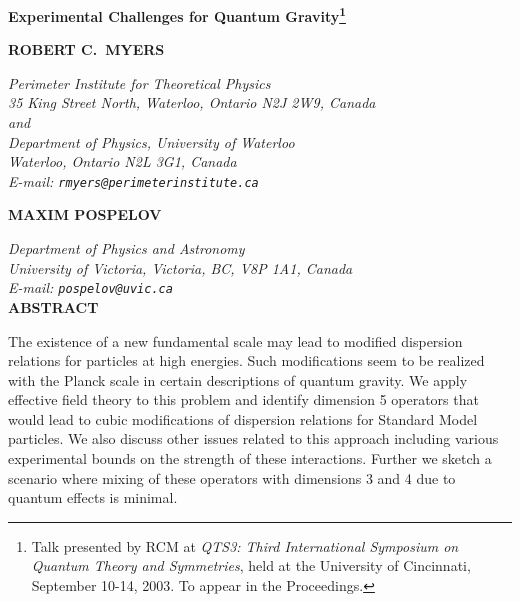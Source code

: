 \documentclass[12pt]{article}
\begin{document}
\setlength{\unitlength}{1mm}

\thispagestyle{empty} 
\vspace*{3cm}

\begin{center}
{\bf \Large Experimental Challenges
 for Quantum Gravity\footnote{Talk presented by {RCM}
at {\it QTS3: Third International Symposium on Quantum Theory and
Symmetries}, held at the University of Cincinnati, September
10-14, 2003. To appear in the Proceedings.}}\\
\vspace*{2cm}

{\bf ROBERT C.~MYERS}

\vspace*{0.2cm}

{\it Perimeter Institute for Theoretical Physics\\
35 King Street North, Waterloo, Ontario N2J 2W9, Canada\\
and\\
Department of Physics, University of Waterloo\\
Waterloo, Ontario N2L 3G1, Canada\\
E-mail: {\tt rmyers@perimeterinstitute.ca}}\\[.5em]

\vspace*{1cm}

{\bf MAXIM POSPELOV}

\vspace*{0.2cm}

{\it Department of Physics and Astronomy\\
University of Victoria, Victoria, BC, V8P 1A1, Canada\\
E-mail: {\tt pospelov@uvic.ca}}\\[.5em]

\vspace{2cm} {\bf ABSTRACT} %
\end{center}

The existence of a new fundamental scale may lead to modified
dispersion relations for particles at high energies. Such
modifications seem to be realized with the Planck scale in certain
descriptions of quantum gravity. We apply effective field theory
to this problem and identify dimension 5 operators that would lead
to cubic modifications of dispersion relations for Standard Model
particles. We also discuss other issues related to this approach
including various experimental bounds on the strength of these
interactions. Further we sketch a scenario where mixing of these
operators with dimensions 3 and 4 due to quantum effects is
minimal.
\end{document}
